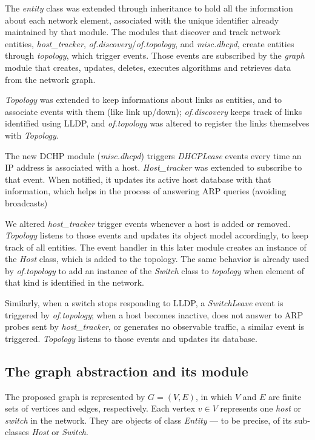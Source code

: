 The \emph{entity} class was
extended through inheritance to hold all the information about each network
element, associated with the unique identifier already maintained by that
module.
The modules that discover and track network entities,
\emph{host\_tracker},
\emph{of.discovery}/\emph{of.topology}, and
\emph{misc.dhcpd},
create entities through \emph{topology}, which trigger events.
Those events are subscribed by the \emph{graph} module that creates, updates, 
deletes, executes algorithms and retrieves data from the network graph. 

\emph{Topology} was
extended to keep informations about links as entities, and to associate
events with them (like link up/down); \emph{of.discovery} keeps track of
links identified using LLDP, and \emph{of.topology} was altered to register
the links themselves with \emph{Topology}.

The new DCHP module (\emph{misc.dhcpd}) triggers \emph{DHCPLease} events
every time an IP address is associated with a host. \emph{Host\_tracker}
was extended to subscribe to that event. When notified, it updates its
active host database with that information, which helps in the process of
answering ARP queries (avoiding broadcasts) 

We altered \emph{host\_tracker} trigger events whenever a host is added or
removed.
\emph{Topology} listens to those events and
updates its object model accordingly, to keep track of all entities.
The event handler in this later module creates an instance of the
\emph{Host} class, which is added to the topology. The same behavior is
already used by \emph{of.topology} to add an instance of the \emph{Switch}
class to \emph{topology} when element of that kind is identified in the
network.

Similarly, when a switch stops responding to LLDP, a \emph{SwitchLeave}
event is triggered by \emph{of.topology}; when a host becomes inactive, 
does not answer to ARP probes sent by \emph{host\_tracker}, or generates no
observable traffic, a similar event is triggered. \emph{Topology}
listens to those events and updates its database.

\subsection{The graph abstraction and its module}

The proposed graph is represented by
$G=(V,E)$, in which $V$ and $E$ are finite sets of vertices and edges,
respectively.
Each vertex $v \in V$ represents one \emph{host} or  
\emph{switch} in the network. They are objects of class \emph{Entity} ---
to be precise, of its sub-classes \emph{Host} or \emph{Switch}.


